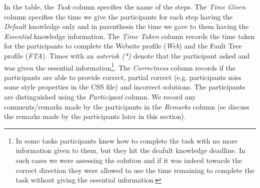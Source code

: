 In the table, the \textit{Task} column specifies the name of the steps. 
The \textit{Time Given} column specifies the time we give the participants for each step having the \textit{Default} knowledge only and in parenthesis the time we gave to them having the \textit{Essential} knowledge information.
The \textit{Time Taken} column records the time taken for the participants to complete the Website profile (\textit{Web}) and the Fault Tree profile (\textit{FTA}). Times with an \textit{asterisk (*)} denote that the participant asked and was given the essential information\footnote{In some tasks participants knew how to complete the task with no more information given to them, but they hit the deafult knowledge deadline. In such cases we were assessing the solution and if it was indeed towards the correct direction they were allowed to use the time remaining to complete the task without giving the essential information.}.
The \textit{Correctness} column records if the participants are able to provide correct, partial correct (e.g. participants miss some style properties in the CSS file) and incorrect solutions. 
The participants are distinguished using the \textit{Participant} column.
We record any comments/remarks made by the participants in the \textit{Remarks} column (se discuss the remarks made by the participants later in this section).



